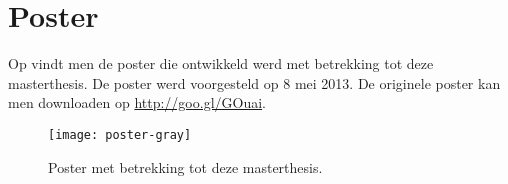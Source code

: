 \chapter{Poster}
Op  vindt men de poster die ontwikkeld werd met betrekking tot deze masterthesis. De poster werd voorgesteld op 8 mei 2013. De originele poster kan men downloaden op \mbox{\url{http://goo.gl/GOuai}}.
\begin{figure}[hbt]
\centering
\texttt{[image: poster-gray]}
\caption{Poster met betrekking tot deze masterthesis.}
\end{figure}

